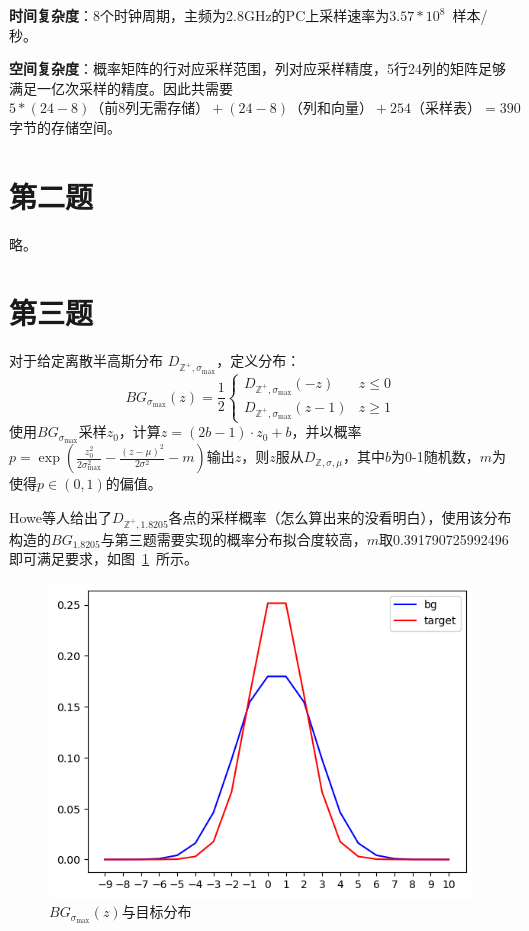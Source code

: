 \documentclass{article}
\begin{document}
    \textbf{时间复杂度}：8个时钟周期，主频为2.8GHz的PC上采样速率为$3.57*10^8$~样本/秒。
    
    \textbf{空间复杂度}：概率矩阵的行对应采样范围，列对应采样精度，5行24列的矩阵足够满足一亿次采样的精度。因此共需要$5 * (24-8)\mbox{（前8列无需存储）} + (24-8)\mbox{（列和向量）} + 254\mbox{（采样表）} = 390$字节的存储空间。
    

    \section{第二题}
    略。

    \section{第三题}
    对于给定离散半高斯分布 $D_{\mathbb{Z}^+, \sigma_{\mathrm{max}}}$，定义分布：
    \begin{equation}
        BG_{\sigma_{\mathrm{max}}}(z) = \frac{1}{2} 
        \begin{cases}
            D_{\mathbb{Z}^+, \sigma_{\mathrm{max}}}(-z) & z \leq 0 \\
            D_{\mathbb{Z}^+, \sigma_{\mathrm{max}}}(z - 1) & z \geq 1
        \end{cases}
    \end{equation}
    使用$BG_{\sigma_{\mathrm{max}}}$采样$z_0$，计算$z = (2b - 1) \cdot z_0 + b$，并以概率$p = \exp(\frac{z_0^2}{2\sigma_{\mathrm{max}}^2} - \frac{(z - \mu)^2}{2\sigma^2} - m)$输出$z$，则$z$服从$D_{\mathbb{Z}, \sigma, \mu}$，其中$b$为0-1随机数，$m$为使得$p \in (0, 1)$的偏值。

    Howe等人\cite{q3}给出了$D_{\mathbb{Z}^+, 1.8205}$各点的采样概率（怎么算出来的没看明白），使用该分布构造的$BG_{1.8205}$与第三题需要实现的概率分布拟合度较高，$m$取0.391790725992496即可满足要求，如图~\ref{fig:q3}~所示。
    \begin{figure}[htb]
        \centering
        \includegraphics[width=.6\textwidth]{q3_0.5.png}
        \caption{$BG_{\sigma_{\mathrm{max}}}(z)$与目标分布}
        \label{fig:q3}
    \end{figure}
\end{document}
